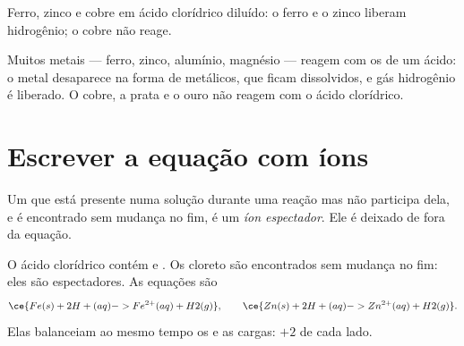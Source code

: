 \begin{omfigure}

{\small Ferro, zinco e cobre em ácido clorídrico diluído: o ferro e o
zinco liberam hidrogênio; o cobre não reage.}
\end{omfigure}

\begin{proposition}\label{prop:g9:metals-acids-corrosion:acid}
Muitos metais --- ferro, zinco, alumínio, magnésio --- reagem com os
  de um ácido: o metal desaparece na forma de  metálicos,
que ficam dissolvidos, e gás hidrogênio é liberado. O cobre, a prata e o
ouro não reagem com o ácido clorídrico.
\end{proposition}

\section{Escrever a equação com íons}

\begin{definition}\label{def:g9:metals-acids-corrosion:spectator}
Um  que está presente numa solução durante uma reação mas não
participa dela, e é encontrado sem mudança no fim, é um \emph{íon
espectador}. Ele é deixado de fora da equação.
\end{definition}

\begin{example}\label{ex:g9:metals-acids-corrosion:iron}
O ácido clorídrico contém   e . Os 
cloreto são encontrados sem mudança no fim: eles são espectadores. As
equações são
\[
  \ce{Fe(s) + 2H+(aq) -> Fe^{2+}(aq) + H2(g)}, \qquad
  \ce{Zn(s) + 2H+(aq) -> Zn^{2+}(aq) + H2(g)}.
\]
Elas balanceiam ao mesmo tempo os  e as cargas: $+2$ de cada lado.
\end{example}


